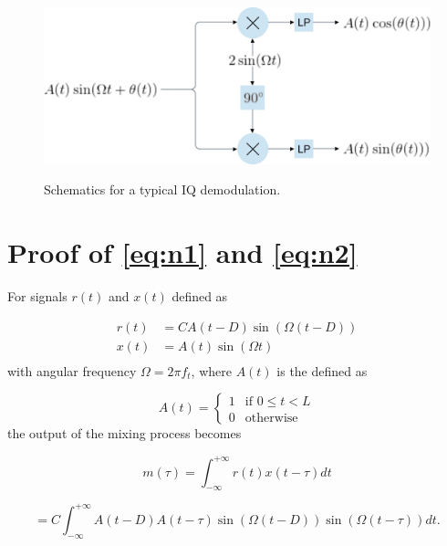 \begin{appendices}
\begin{figure}
	\centering
	\hbox{\hspace{-0.5em} \includegraphics[scale=0.60]{figs_temp/iq_demod.jpg}}
	\caption{Schematics for a typical IQ demodulation.}
	\label{fig:iq_demod}
\end{figure}

\chapter{Proof of \ref{eq:n1} and \ref{eq:n2}}

For signals $r(t)$ and $x(t)$ defined as

\begin{equation}
	\begin{split}
		r(t) &= CA(t - D)\sin(\Omega(t - D)) \\
		x(t) &= A(t)\sin(\Omega t) \\
	\end{split}
\end{equation}
with angular frequency $\Omega = 2\pi f_t$, where $A(t)$ is the defined as 

\begin{equation}
	A(t) = \begin{cases}
		1 & \text{if $0 \leq t < L$} \\
		0 & \text{otherwise}
	\end{cases}
\end{equation}
the output of the mixing process becomes

\begin{equation}
	m(\tau) 
	= \int_{-\infty}^{+\infty}r(t)x(t-\tau)dt
\end{equation}

\begin{equation}	
	= C \int_{-\infty}^{+\infty}A(t-D)A(t-\tau)\sin(\Omega(t-D))\sin(\Omega(t-\tau))dt.
\end{equation}


\end{appendices}

